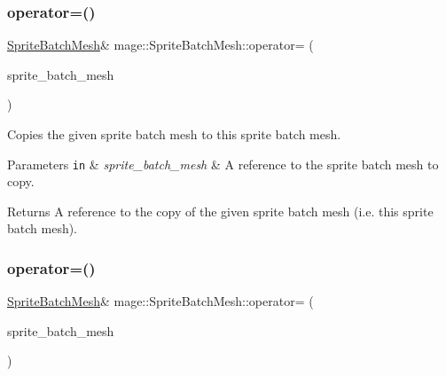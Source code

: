 \subsubsection{\texorpdfstring{operator=()}{operator=()}\hspace{0.1cm}{\footnotesize\ttfamily [1/2]}}
{\footnotesize\ttfamily \hyperlink{classmage_1_1_sprite_batch_mesh}{Sprite\+Batch\+Mesh}\& mage\+::\+Sprite\+Batch\+Mesh\+::operator= (\begin{DoxyParamCaption}\item[{const \hyperlink{classmage_1_1_sprite_batch_mesh}{Sprite\+Batch\+Mesh} \&}]{sprite\+\_\+batch\+\_\+mesh }\end{DoxyParamCaption})\hspace{0.3cm}{\ttfamily [delete]}}

Copies the given sprite batch mesh to this sprite batch mesh.


\begin{DoxyParams}[1]{Parameters}
\mbox{\tt in}  & {\em sprite\+\_\+batch\+\_\+mesh} & A reference to the sprite batch mesh to copy. \\
\hline
\end{DoxyParams}
\begin{DoxyReturn}{Returns}
A reference to the copy of the given sprite batch mesh (i.\+e. this sprite batch mesh). 
\end{DoxyReturn}
\hypertarget{classmage_1_1_sprite_batch_mesh_a678700348ef43c46ed90d87d78c498de}{}\label{classmage_1_1_sprite_batch_mesh_a678700348ef43c46ed90d87d78c498de} 
\subsubsection{\texorpdfstring{operator=()}{operator=()}\hspace{0.1cm}{\footnotesize\ttfamily [2/2]}}
{\footnotesize\ttfamily \hyperlink{classmage_1_1_sprite_batch_mesh}{Sprite\+Batch\+Mesh}\& mage\+::\+Sprite\+Batch\+Mesh\+::operator= (\begin{DoxyParamCaption}\item[{\hyperlink{classmage_1_1_sprite_batch_mesh}{Sprite\+Batch\+Mesh} \&\&}]{sprite\+\_\+batch\+\_\+mesh }\end{DoxyParamCaption})\hspace{0.3cm}{\ttfamily [delete]}}

